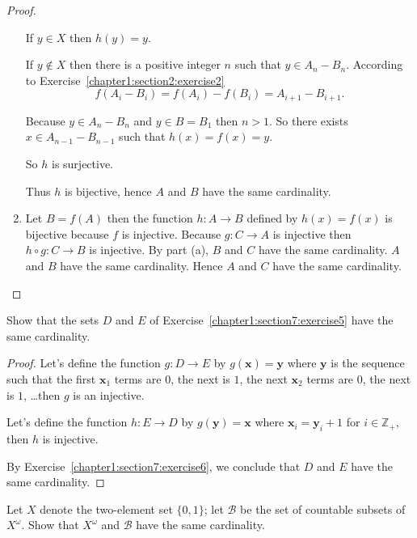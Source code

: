 \begin{proof}
\begin{enumerate}[label={(\alph*)}]
              If $y\in X$ then $h(y) = y$.

              If $y\notin X$ then there is a positive integer $n$ such that $y\in A_{n} - B_{n}$. According to Exercise~\ref{chapter1:section2:exercise2}
              \[
                  f(A_{i} - B_{i}) = f(A_{i}) - f(B_{i}) = A_{i+1} - B_{i+1}.
              \]

              Because $y\in A_{n} - B_{n}$ and $y\in B = B_{1}$ then $n > 1$. So there exists $x\in A_{n-1} - B_{n-1}$ such that $h(x) = f(x) = y$.

              So $h$ is surjective.

              Thus $h$ is bijective, hence $A$ and $B$ have the same cardinality.
        \item Let $B = f(A)$ then the function $h: A\to B$ defined by $h(x) = f(x)$ is bijective because $f$ is injective. Because $g: C\to A$ is injective then $h\circ g: C\to B$ is injective. By part (a), $B$ and $C$ have the same cardinality. $A$ and $B$ have the same cardinality. Hence $A$ and $C$ have the same cardinality.
    \end{enumerate}
\end{proof}

\begin{exercise}\label{chapter1:section7:exercise7}
    Show that the sets $D$ and $E$ of Exercise~\ref{chapter1:section7:exercise5} have the same cardinality.
\end{exercise}

\begin{proof}
    Let's define the function $g: D\to E$ by $g(\mathbf{x}) = \mathbf{y}$ where $\mathbf{y}$ is the sequence such that the first $\mathbf{x}_{1}$ terms are $0$, the next is $1$, the next $\mathbf{x}_{2}$ terms are $0$, the next is $1$, \ldots then $g$ is an injective.

    Let's define the function $h: E\to D$ by $g(\mathbf{y}) = \mathbf{x}$ where $\mathbf{x}_{i} = \mathbf{y}_{i} + 1$ for $i\in\mathbb{Z}_{+}$, then $h$ is injective.

    By Exercise~\ref{chapter1:section7:exercise6}, we conclude that $D$ and $E$ have the same cardinality.
\end{proof}

\begin{exercise}\label{chapter1:section7:exercise8}
    Let $X$ denote the two-element set $\{ 0, 1 \}$; let $\mathscr{B}$ be the set of countable subsets of $X^{\omega}$. Show that $X^{\omega}$ and $\mathscr{B}$ have the same cardinality.
\end{exercise}

